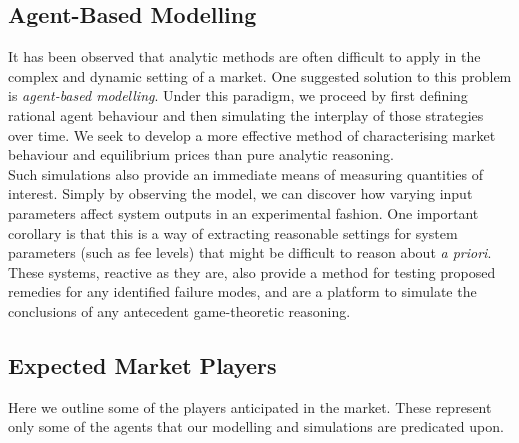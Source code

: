 \subsection{Agent-Based Modelling}
It has been observed that analytic methods are often difficult to
apply in the complex and dynamic setting of a market.
One suggested solution to this problem is \textit{agent-based modelling}.
Under this paradigm, we proceed by first defining rational agent behaviour
and then simulating the interplay of those strategies over time.
We seek to develop a more effective
method of characterising market behaviour and equilibrium prices than pure analytic reasoning. \\

\noindent Such simulations also provide an immediate means of measuring
quantities of interest. Simply by observing
the model, we can discover how varying input parameters
affect system outputs in an experimental fashion.
One important corollary is that this is a way of extracting reasonable
settings for system parameters (such as fee levels) that might be difficult
to reason about \textit{a priori}. These systems, reactive as they are,
also provide a method for testing proposed remedies for any identified failure
modes, and are a platform to simulate the conclusions of any antecedent game-theoretic
reasoning. \\

\subsection{Expected Market Players}

Here we outline some of the players anticipated in the market. These
represent only some of the agents that our modelling and simulations are predicated upon.

